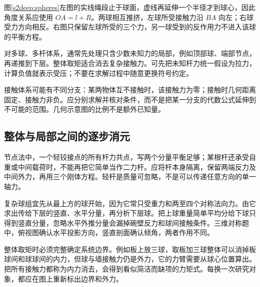 图\ref{s2deep:spheres}左图的实线绳段止于球面，虚线再延伸一个半径才到球心，因此角度关系应使用 $OA=l+R$。两球相互推挤，左球所受接触力沿 $BA$ 向左；右球受力方向相反。右图只保留左球所受的三个力，另一球受到的反作用力不进入该球的平衡方程。


对多球、多杆体系，通常先处理只含少数未知力的局部，例如顶部球、端部节点，再递推到下层。整体取矩适合消去复杂接触力。可先把未知杆力统一假设为拉力，计算负值就表示受压；不要在求解过程中随意更换符号约定。

接触体系可能有不同分支：某两物体互不接触时，该接触力为零；接触时几何距离固定、接触力非负。应分别求解并核对条件，而不是把某一分支的代数公式延伸到不可能的范围。几何示意图的比例不是额外已知量。

\subsection{整体与局部之间的逐步消元}
节点法中，一个轻铰接点的所有杆力共点，写两个分量平衡足够；某根杆还承受自重或中间载荷时，不能再把它简单当作二力杆。应将杆本身隔离，保留两端反力及中间外力，再用三个刚体方程。轻杆是质量可忽略，不是可以传递任意方向的单一轴力。

复杂球组宜先从最上方的球开始，因为它常只受重力和两至四个对称法向力。由它求出传给下层的竖直、水平分量，再分析下层球。把上球重量简单平均分给下球只得到竖直分量，忽略水平外推分量会漏掉碗壁反力和球间接触条件。三维对称题中，俯视图确认水平投影方向，竖直剖面确认倾角，两者作用不同。

整体取矩时必须完整确定系统边界。例如板上放三球，取板加三球整体可以消掉板球间和球球间的内力，但球与墙接触力仍是外力，它的力臂需要从球心位置算出。把所有接触力都称为内力消去，会得到看似简洁而缺项的力矩式。每换一次研究对象，都应在图上重新标出边界和外力。


